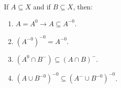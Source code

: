 If $A \subseteq X$ and if $B \subseteq X$, then:
\begin{enumerate}
\item $A = A^0 \rightarrow A \subseteq A^{-0}$.
\item $(A^{-0})^{-0} = A^{-0}$.
\item $(A^0 \cap B^-) \subseteq (A \cap B)^-$.
\item $(A \cup B^{-0})^{-0} \subseteq (A^- \cup B^{-0})^{-0}$.
\end{enumerate}
